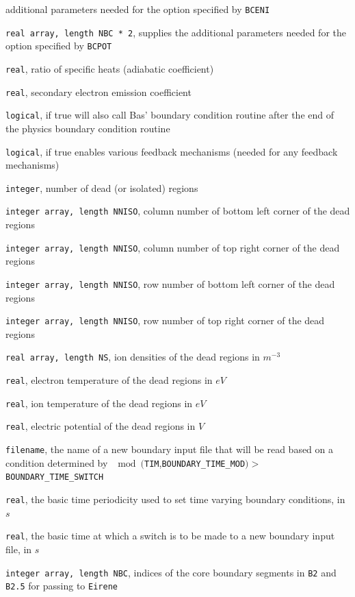 \documentclass[a4paper,10pt]{report}
\begin{document}
\begin{description}
  additional parameters needed for the option specified by
  {\tt BCENI}
\item[POTPAR] {\tt real array, length NBC * 2}, supplies the
  additional parameters needed for the option specified by
  {\tt BCPOT}
\item[GAMMAI] {\tt real}, ratio of specific heats (adiabatic coefficient)
\item[GAMMAE] {\tt real}, secondary electron emission coefficient
\item[LBNDUSR] {\tt logical}, if true will also
  call Bas' boundary condition routine after the end of the physics
  boundary condition routine
\item[LFEEDBACK] {\tt logical}, if true enables various
  feedback mechanisms (needed for any feedback mechanisms)
\item[NNISO] {\tt integer}, number of dead (or isolated)
  regions
\item[NXISO1] {\tt integer array, length NNISO}, column number
  of bottom left corner of the dead regions
\item[NXISO2] {\tt integer array, length NNISO}, column number
  of top right corner of the dead regions
\item[NYISO1] {\tt integer array, length NNISO}, row number
  of bottom left corner of the dead regions
\item[NYISO2] {\tt integer array, length NNISO}, row number
  of top right corner of the dead regions
\item[NIISO] {\tt real array, length NS}, ion densities of the
  dead regions in $m^{-3}$
\item[TEISO] {\tt real}, electron temperature  of the
  dead regions in $eV$
\item[TIISO] {\tt real}, ion temperature of the
  dead regions in $eV$
\item[PHIISO] {\tt real}, electric potential of the
  dead regions in $V$
\item[BOUNDARY\_FILENAME] {\tt filename}, the name of a new
  boundary input file that will be read based on a condition
  determined by $\mod(${\tt TIM},{\tt BOUNDARY\_TIME\_MOD}$)>${\tt BOUNDARY\_TIME\_SWITCH}
\item[BOUNDARY\_TIME\_MOD] {\tt real},
  the basic time periodicity used to set time varying boundary
  conditions, in $s$
\item[BOUNDARY\_TIME\_SWITCH]
  {\tt real}, the basic time at which a switch is to be made to a new
  boundary input file, in $s$
\item[LCBS] {\tt integer array, length NBC}, indices of the core boundary
  segments in {\tt B2} and {\tt B2.5} for passing to {\tt Eirene}
\end{description}
\end{document}
